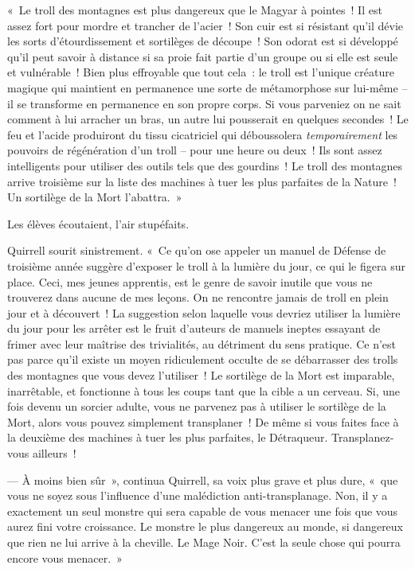«~Le troll des montagnes est plus dangereux que le Magyar à pointes~!
Il est assez fort pour mordre et trancher de l'acier~!
Son cuir est si résistant qu'il dévie les sorts d'étourdissement et sortilèges de découpe~!
Son odorat est si développé qu'il peut savoir à distance si sa proie fait partie d'un groupe ou si elle est seule et vulnérable~!
Bien plus effroyable que tout cela~: le troll est l'unique créature magique qui maintient en permanence une sorte de métamorphose sur lui-même -- il se transforme en permanence en son propre corps.
Si vous parveniez on ne sait comment à lui arracher un bras, un autre lui pousserait en quelques secondes~!
Le feu et l'acide produiront du tissu cicatriciel qui déboussolera \emph{temporairement} les pouvoirs de régénération d'un troll -- pour une heure ou deux~!
Ils sont assez intelligents pour utiliser des outils tels que des gourdins~!
Le troll des montagnes arrive troisième sur la liste des machines à tuer les plus parfaites de la Nature~!
Un sortilège de la Mort l'abattra.~»

Les élèves écoutaient, l'air stupéfaits.

Quirrell sourit sinistrement.
«~Ce qu'on ose appeler un manuel de Défense de troisième année suggère d'exposer le troll à la lumière du jour, ce qui le figera sur place.
Ceci, mes jeunes apprentis, est le genre de savoir inutile que vous ne trouverez dans aucune de mes leçons.
On ne rencontre jamais de troll en plein jour et à découvert~!
La suggestion selon laquelle vous devriez utiliser la lumière du jour pour les arrêter est le fruit d'auteurs de manuels ineptes essayant de frimer avec leur maîtrise des trivialités, au détriment du sens pratique.
Ce n'est pas parce qu'il existe un moyen ridiculement occulte de se débarrasser des trolls des montagnes que vous devez l'utiliser~!
Le sortilège de la Mort est imparable, inarrêtable, et fonctionne à tous les coups tant que la cible a un cerveau.
Si, une fois devenu un sorcier adulte, vous ne parvenez pas à utiliser le sortilège de la Mort, alors vous pouvez simplement transplaner~!
De même si vous faites face à la deuxième des machines à tuer les plus parfaites, le Détraqueur.
Transplanez-vous ailleurs~!

--- À moins bien sûr~», continua Quirrell, sa voix plus grave et plus dure, «~que vous ne soyez sous l'influence d'une malédiction anti-transplanage.
Non, il y a exactement un seul monstre qui sera capable de vous menacer une fois que vous aurez fini votre croissance.
Le monstre le plus dangereux au monde, si dangereux que rien ne lui arrive à la cheville.
Le Mage Noir.
C'est la seule chose qui pourra encore vous menacer.~»

